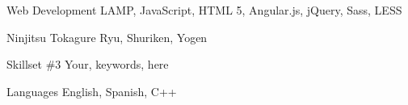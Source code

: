 


\begin{cvskills}



  \cvskill
    {Web Development} %
    {LAMP, JavaScript, HTML 5, Angular.js, jQuery, Sass, LESS} %


  \cvskill
    {Ninjitsu} %
    {Tokagure Ryu, Shuriken, Yogen} %


  \cvskill
    {Skillset \#3} %
    {Your, keywords, here} %





  \cvskill
    {Languages} %
    {English, Spanish, C++} %



\end{cvskills}

